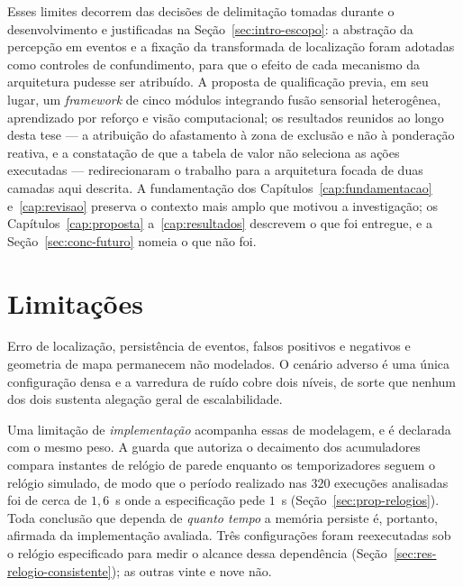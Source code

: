 Esses limites decorrem das decisões de delimitação tomadas durante o
desenvolvimento e justificadas na Seção~\ref{sec:intro-escopo}: a abstração da
percepção em eventos e a fixação da transformada de localização foram adotadas como
controles de confundimento, para que o efeito de cada mecanismo da arquitetura
pudesse ser atribuído. A proposta de qualificação previa, em seu lugar, um
\textit{framework} de cinco módulos integrando fusão sensorial heterogênea,
aprendizado por reforço e visão computacional; os resultados reunidos ao longo desta
tese --- a atribuição do afastamento à zona de exclusão e não à ponderação reativa, e
a constatação de que a tabela de valor não seleciona as ações executadas ---
redirecionaram o trabalho para a arquitetura focada de duas camadas aqui descrita. A
fundamentação dos Capítulos~\ref{cap:fundamentacao} e~\ref{cap:revisao} preserva o
contexto mais amplo que motivou a investigação; os
Capítulos~\ref{cap:proposta} a~\ref{cap:resultados} descrevem o que foi entregue, e
a Seção~\ref{sec:conc-futuro} nomeia o que não foi.

\section{Limitações}
\label{sec:conc-limitacoes}

Erro de localização, persistência de eventos, falsos positivos e negativos e
geometria de mapa permanecem não modelados. O cenário adverso é uma única
configuração densa e a varredura de ruído cobre dois níveis, de sorte que nenhum dos
dois sustenta alegação geral de escalabilidade.

Uma limitação de \emph{implementação} acompanha essas de modelagem, e é declarada com
o mesmo peso. A guarda que autoriza o decaimento dos acumuladores compara instantes de
relógio de parede enquanto os temporizadores seguem o relógio simulado, de modo que o
período realizado nas $320$ execuções analisadas foi de cerca de $1{,}6$~s onde a
especificação pede $1$~s (Seção~\ref{sec:prop-relogios}). Toda conclusão que dependa de
\emph{quanto tempo} a memória persiste é, portanto, afirmada da implementação avaliada.
Três configurações foram reexecutadas sob o relógio especificado para medir o alcance
dessa dependência (Seção~\ref{sec:res-relogio-consistente}); as outras vinte e nove
não.

